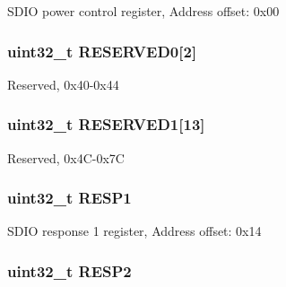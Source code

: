 S\-D\-I\-O power control register, Address offset\-: 0x00 \hypertarget{struct_s_d_i_o___type_def_a8be676577db129a84a9a2689519a8502}{
\subsubsection[{R\-E\-S\-E\-R\-V\-E\-D0}]{\setlength{\rightskip}{0pt plus 5cm}uint32\-\_\-t R\-E\-S\-E\-R\-V\-E\-D0\mbox{[}2\mbox{]}}}\label{struct_s_d_i_o___type_def_a8be676577db129a84a9a2689519a8502}
Reserved, 0x40-\/0x44 \hypertarget{struct_s_d_i_o___type_def_a2d531df35272b1f3d787e5726ed5c52c}{
\subsubsection[{R\-E\-S\-E\-R\-V\-E\-D1}]{\setlength{\rightskip}{0pt plus 5cm}uint32\-\_\-t R\-E\-S\-E\-R\-V\-E\-D1\mbox{[}13\mbox{]}}}\label{struct_s_d_i_o___type_def_a2d531df35272b1f3d787e5726ed5c52c}
Reserved, 0x4\-C-\/0x7\-C \hypertarget{struct_s_d_i_o___type_def_a7b0ee0dc541683266dfab6335abca891}{
\subsubsection[{R\-E\-S\-P1}]{ uint32\-\_\-t R\-E\-S\-P1}}\label{struct_s_d_i_o___type_def_a7b0ee0dc541683266dfab6335abca891}
S\-D\-I\-O response 1 register, Address offset\-: 0x14 \hypertarget{struct_s_d_i_o___type_def_a4d99c78dffdb6e81e8f6b7abec263419}{
\subsubsection[{R\-E\-S\-P2}]{ uint32\-\_\-t R\-E\-S\-P2}}\label{struct_s_d_i_o___type_def_a4d99c78dffdb6e81e8f6b7abec263419}
